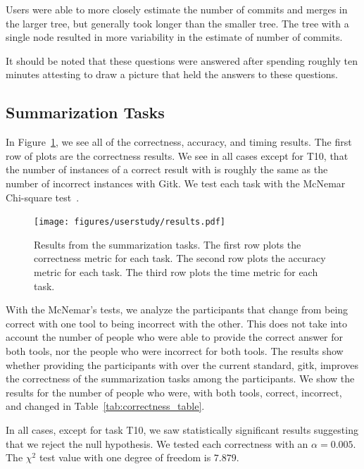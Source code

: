 \documentclass[draft]{IEEEtran}
\begin{document}
Users were able to more closely estimate the number of commits and
merges in the larger tree, but generally took longer than the smaller
tree. The tree with a single node resulted in more variability in the
estimate of number of commits.

It should be noted that these questions were answered after spending
roughly ten minutes attesting to draw a picture that held the answers to
these questions.

\subsection{Summarization Tasks}
\label{sub:summarization_tasks}

In Figure~\ref{fig:summarization_results}, we see all of the
correctness, accuracy, and timing results. The first row of plots are
the correctness results. We see in all cases except for T10, that the
number of instances of a correct result with \tool is roughly the same
as the number of incorrect instances with Gitk. We test each task with
the McNemar Chi-square test~\cite{McNemar1947}.

\begin{figure}[htpb]
  \centering
  \texttt{[image: figures/userstudy/results.pdf]}
  \caption{Results from the summarization tasks. The first row plots the
    correctness metric for each task. The second row plots the
    accuracy metric for each task. The third row plots the time metric
    for each task.}
  \label{fig:summarization_results}
\end{figure}

With the McNemar's tests, we analyze the participants that change from
being correct with one tool to being incorrect with the other. This does
not take into account the number of people who were able to provide the
correct answer for both tools, nor the people who were incorrect for both
tools. The results show whether providing the participants with \tool
over the current standard, gitk, improves the correctness of the
summarization tasks among the participants. We show the results for the
number of people who were, with both tools, correct, incorrect, and
changed in Table~\ref{tab:correctness_table}.

In all cases, except for task T10, we saw statistically significant
results suggesting that we reject the null hypothesis. We tested each
correctness with an $\alpha = 0.005$. The $\chi^2$ test value with one
degree of freedom is $7.879$.
\end{document}
